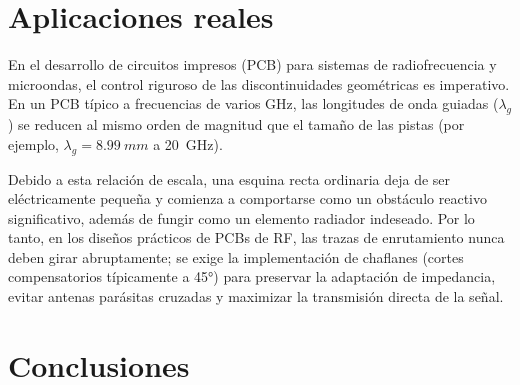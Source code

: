 \documentclass[11pt,letterpaper]{article}
\begin{document}
\section{Aplicaciones reales}
\label{sec:aplicaciones_reales}

En el desarrollo de circuitos impresos (PCB) para sistemas de radiofrecuencia y microondas, el control riguroso de las discontinuidades geométricas es imperativo. En un PCB típico a frecuencias de varios GHz, las longitudes de onda guiadas ($\lambda_g$) se reducen al mismo orden de magnitud que el tamaño de las pistas (por ejemplo, $\lambda_g = \SI{8.99}{mm}$ a \SI{20}{GHz}). 

Debido a esta relación de escala, una esquina recta ordinaria deja de ser eléctricamente pequeña y comienza a comportarse como un obstáculo reactivo significativo, además de fungir como un elemento radiador indeseado. Por lo tanto, en los diseños prácticos de PCBs de RF, las trazas de enrutamiento nunca deben girar abruptamente; se exige la implementación de chaflanes (cortes compensatorios típicamente a \ang{45}) para preservar la adaptación de impedancia, evitar antenas parásitas cruzadas y maximizar la transmisión directa de la señal.


\section{Conclusiones}
\end{document}

